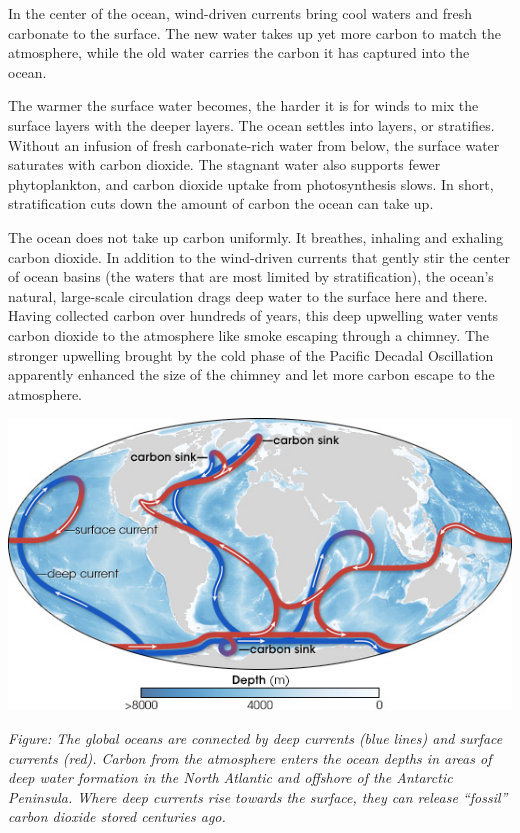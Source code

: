 \documentclass[
]{book}
\begin{document}
In the center of the ocean, wind-driven currents bring cool waters and fresh carbonate to the surface. The new water takes up yet more carbon to match the atmosphere, while the old water carries the carbon it has captured into the ocean.

The warmer the surface water becomes, the harder it is for winds to mix the surface layers with the deeper layers. The ocean settles into layers, or stratifies. Without an infusion of fresh carbonate-rich water from below, the surface water saturates with carbon dioxide. The stagnant water also supports fewer phytoplankton, and carbon dioxide uptake from photosynthesis slows. In short, stratification cuts down the amount of carbon the ocean can take up.

The ocean does not take up carbon uniformly. It breathes, inhaling and exhaling carbon dioxide. In addition to the wind-driven currents that gently stir the center of ocean basins (the waters that are most limited by stratification), the ocean's natural, large-scale circulation drags deep water to the surface here and there. Having collected carbon over hundreds of years, this deep upwelling water vents carbon dioxide to the atmosphere like smoke escaping through a chimney. The stronger upwelling brought by the cold phase of the Pacific Decadal Oscillation apparently enhanced the size of the chimney and let more carbon escape to the atmosphere.

\includegraphics{fig/ocean_circulation_carbon_sinks.jpg}

\emph{Figure: The global oceans are connected by deep currents (blue lines) and surface currents (red). Carbon from the atmosphere enters the ocean depths in areas of deep water formation in the North Atlantic and offshore of the Antarctic Peninsula. Where deep currents rise towards the surface, they can release ``fossil'' carbon dioxide stored centuries ago.}
\end{document}

